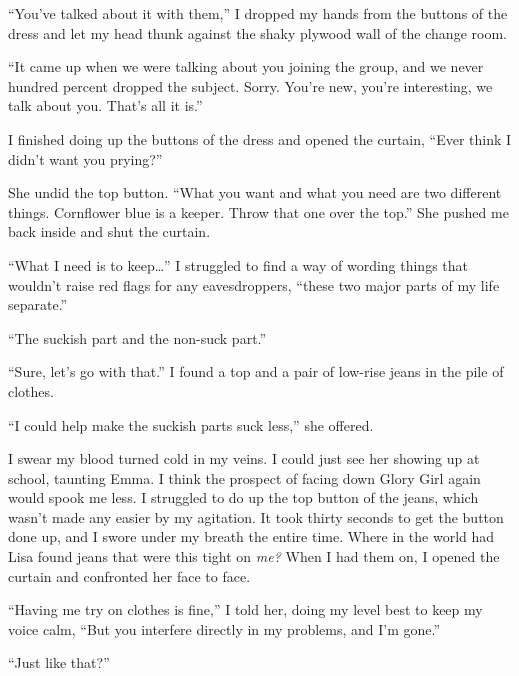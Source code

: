 ``You've talked about it with them,'' I dropped my hands from the buttons of the dress and let my head thunk against the shaky plywood wall of the change room.



``It came up when we were talking about you joining the group, and we never hundred percent dropped the subject.  Sorry.  You're new, you're interesting, we talk about you.  That's all it is.''



I finished doing up the buttons of the dress and opened the curtain, ``Ever think I didn't want you prying?''



She undid the top button. ``What you want and what you need are two different things.  Cornflower blue is a keeper. Throw that one over the top.''  She pushed me back inside and shut the curtain.



``What I need is to keep\ldots'' I struggled to find a way of wording things that wouldn't raise red flags for any eavesdroppers, ``these two major parts of my life separate.''



``The suckish part and the non-suck part.''



``Sure, let's go with that.''  I found a top and a pair of low-rise jeans in the pile of clothes.



``I could help make the suckish parts suck less,'' she offered.



I swear my blood turned cold in my veins.  I could just see her showing up at school, taunting Emma.  I think the prospect of facing down Glory Girl again would spook me less.  I struggled to do up the top button of the jeans, which wasn't made any easier by my agitation.  It took thirty seconds to get the button done up, and I swore under my breath the entire time.  Where in the world had Lisa found jeans that were this tight on \emph{me?  }When I had them on, I opened the curtain and confronted her face to face.



``Having me try on clothes is fine,'' I told her, doing my level best to keep my voice calm, ``But you interfere directly in my problems, and I'm gone.''



``Just like that?''



